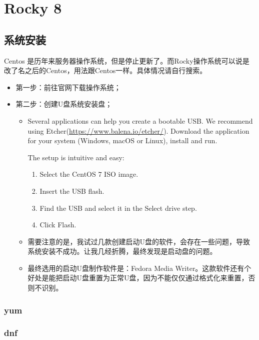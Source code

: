 {\part{Rocky 8}
\chapter{系统安装}
Centos 是历年来服务器操作系统，但是停止更新了。而Rocky操作系统可以说是改了名之后的Centos，用法跟Centos一样。具体情况请自行搜索。

\begin{itemize}
\item 第一步：前往官网下载操作系统；

\item 第二步：创建U盘系统安装盘；
\begin{itemize}
\item Several applications can help you create a bootable USB. We recommend using Etcher(\url{https://www.balena.io/etcher/}). Download the application for your system (Windows, macOS or Linux), install and run.

The setup is intuitive and easy:
\begin{enumerate}
\item Select the CentOS 7 ISO image.
\item Insert the USB flash.
\item Find the USB and select it in the Select drive step.
\item Click Flash.
\end{enumerate}

\item 需要注意的是，我试过几款创建启动U盘的软件，会存在一些问题，导致系统安装不成功。让我几经折腾，最终发现是启动盘的问题。

\item 最终选用的启动U盘制作软件是：Fedora Media Writer。这款软件还有个好处是能把启动U盘重置为正常U盘，因为不能仅仅通过格式化来重置，否则不识别。
\end{itemize}

\end{itemize}



\section{yum}


\section{dnf}



}

